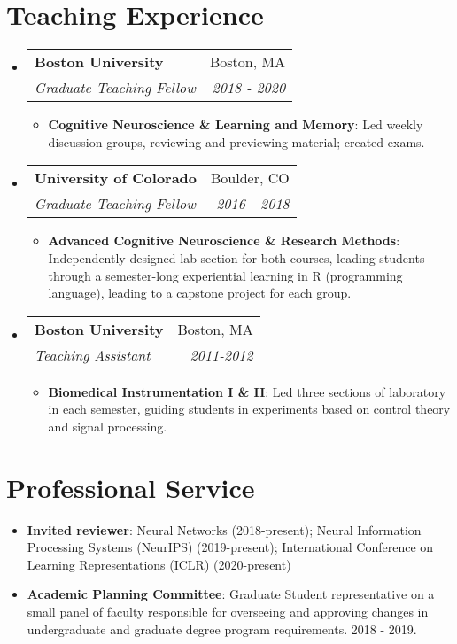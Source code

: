 \documentclass[a4paper,20pt]{article}
\makeatletter
\newcommand{\resumeItem}[2]{
  \item\small{
    \textbf{#1}{: #2 \vspace{-2pt}}
  }
}
\newcommand{\resumeSubheading}[4]{
  \vspace{-1pt}\item
    \begin{tabular*}{0.97\textwidth}{l@{\extracolsep{\fill}}r}
      \textbf{#1} & #2 \\
      \textit{#3} & \textit{#4} \\
    \end{tabular*}\vspace{-5pt}
}
\newcommand{\resumeSubHeadingListStart}{\begin{itemize}[leftmargin=*]}
\newcommand{\resumeSubHeadingListEnd}{\end{itemize}}
\newcommand{\resumeItemListStart}{\begin{itemize}}
\newcommand{\resumeItemListEnd}{\end{itemize}\vspace{-5pt}}
\makeatother
\begin{document}
\vspace{-5pt}
\section{Teaching Experience}
\resumeSubHeadingListStart

    \resumeSubheading{Boston University}{Boston, MA}
    {Graduate Teaching Fellow}{2018 - 2020}
    \resumeItemListStart
      \resumeItem{Cognitive Neuroscience \& Learning and Memory}{Led weekly discussion groups, reviewing and previewing material; created exams.}
    \resumeItemListEnd

    \resumeSubheading{University of Colorado}{Boulder, CO}
    {Graduate Teaching Fellow}{2016 - 2018}
    \resumeItemListStart
      \resumeItem{Advanced Cognitive Neuroscience \& Research Methods}{Independently designed lab section for both courses, leading students through a semester-long experiential learning in R (programming language), leading to a capstone project for each group.}
    \resumeItemListEnd

    \resumeSubheading{Boston University}{Boston, MA}
    {Teaching Assistant}{2011-2012}
    \resumeItemListStart
      \resumeItem{Biomedical Instrumentation I \& II}{Led three sections of laboratory in each semester, guiding students in experiments based on control theory and signal processing.}
    \resumeItemListEnd
\resumeSubHeadingListEnd

\vspace{-5pt}
\section{Professional Service}
\begin{itemize}
    \item \textbf{Invited reviewer}: Neural Networks (2018-present); Neural Information Processing Systems (NeurIPS) (2019-present); International Conference on Learning Representations (ICLR) (2020-present)
    \item \textbf{Academic Planning Committee}: Graduate Student representative on a small panel of faculty responsible for overseeing and approving changes in undergraduate and graduate degree program requirements. 2018 - 2019.
\end{itemize}


\pagebreak
\vspace{-5pt}
\end{document}
